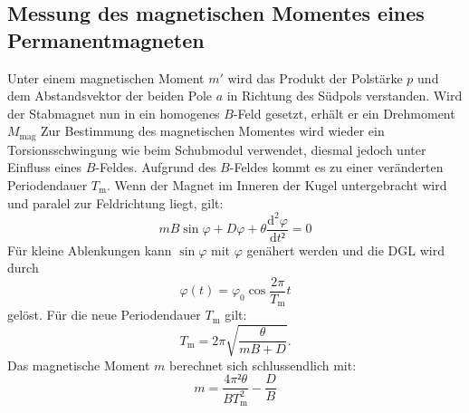 \subsection{Messung des magnetischen Momentes eines Permanentmagneten}
Unter einem magnetischen Moment $m'$ wird das Produkt der Polstärke $p$
 und dem Abstandsvektor der beiden Pole $a$ in Richtung des Südpols verstanden.
  Wird der Stabmagnet nun in ein homogenes $B$-Feld gesetzt,
   erhält er ein Drehmoment $M_{\text{mag}}$
Zur Bestimmung des magnetischen Momentes wird wieder ein Torsionsschwingung wie
 beim Schubmodul verwendet, diesmal jedoch unter Einfluss eines $B$-Feldes.
  Aufgrund des $B$-Feldes kommt es zu einer veränderten Periodendauer $T_\text{m}$.  Wenn
  der Magnet im Inneren der Kugel untergebracht wird und paralel zur Feldrichtung liegt, gilt:
  \begin{equation}
    mB\sin\varphi + D\varphi + \theta\frac{\text{d}^2\varphi}{\text{d}t²} = 0
  \end{equation}
  Für kleine Ablenkungen kann $\sin \varphi$ mit $\varphi$ genähert werden und die DGL wird durch
  \begin{equation}
    \varphi(t) = \varphi_\text{0} \cos\frac{2\pi}{T_\text{m}}t
  \end{equation}
  gelöst. Für die neue Periodendauer $T_\text{m}$ gilt:
  \begin{equation}
    T_\text{m} = 2\pi\sqrt{\frac{\theta}{mB + D}}\text{.}
  \end{equation}
Das magnetische Moment $m$ berechnet sich schlussendlich mit:
\begin{equation}
  m = \frac{4\pi²\theta}{BT_\text{m}^2} - \frac{D}{B}
\end{equation}
